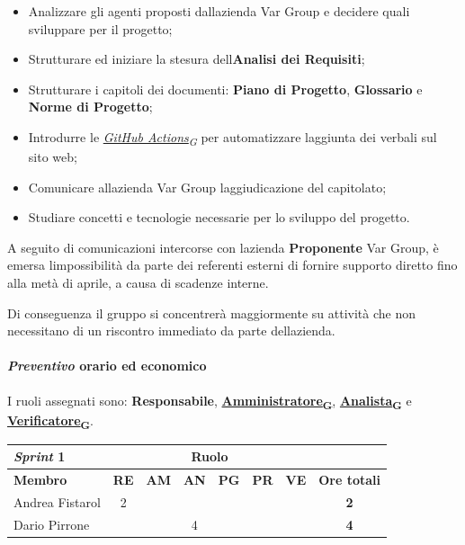 \documentclass[12pt, a4paper]{article}
\newcommand{\urlglossario}{https://skynetunigroup.github.io/Code_Guardian/Documentazione/RTB/glossario_v1.0.0.pdf} %
\newcommand{\glo}[2]{\href{\urlglossario\#nameddest=#2}{#1\textsubscript{G}}}
\begin{document}
{\begin{itemize}
\item
  Analizzare gli agenti proposti dall\textquotesingle azienda Var Group e
  decidere quali sviluppare per il progetto;
\item
  Strutturare ed iniziare la stesura dell\textquotesingle \textbf{Analisi dei Requisiti};
\item
  Strutturare i capitoli dei documenti: \textbf{Piano di Progetto},
  \textbf{Glossario} e \textbf{Norme di Progetto};
\item
  Introdurre le \textit{\glo{GitHub Actions}{github-actions}} per automatizzare
  l\textquotesingle aggiunta dei verbali sul sito web;
\item
  Comunicare all\textquotesingle azienda Var Group
  l\textquotesingle aggiudicazione del capitolato;
\item
  Studiare concetti e tecnologie necessarie per lo sviluppo del
  progetto.
\end{itemize}

A seguito di comunicazioni intercorse con l\textquotesingle azienda
\textbf{Proponente} Var Group, è emersa l\textquotesingle impossibilità da parte
dei referenti esterni di fornire supporto diretto fino alla metà di
aprile, a causa di scadenze interne.

Di conseguenza il gruppo si concentrerà maggiormente su attività che non
necessitano di un riscontro immediato da parte
dell\textquotesingle azienda.
\paragraph{\textit{Preventivo} orario ed economico}

I ruoli assegnati sono: \textbf{Responsabile}, \textbf{\glo{Amministratore}{amministratore}}, \textbf{\glo{Analista}{analista}} e \textbf{\glo{Verificatore}{verificatore}}.
\begin{table}[H]
    \centering
    \renewcommand{\arraystretch}{1.3}
    \begin{tabularx}{0.9\textwidth}{|X|c|c|c|c|c|c|c|}
        \hline
        \textbf{\textit{Sprint} 1} & \multicolumn{6}{|c|}{\textbf{Ruolo}} & \\ \hline
        \textbf{Membro} &\textbf{RE} & \textbf{AM} & \textbf{AN} & \textbf{PG} & \textbf{PR} & \textbf{VE} & \textbf{Ore totali} \\ \hline
        Andrea Fistarol & 2 & & & & & & \textbf{2} \\ \hline
        Dario Pirrone & & & 4 & & & & \textbf{4} \\ \hline
  

\end{tabularx}
\end{table}}
\end{document}
